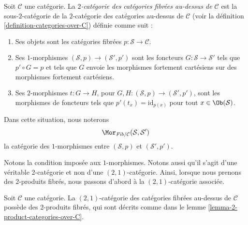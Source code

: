 \begin{definition}
\label{definition-fibred-categories-over-C}
Soit $\mathcal{C}$ une catégorie.
La {\it $2$-catégorie des catégories fibrées au-dessus de $\mathcal{C}$}
est la sous-$2$-catégorie de la $2$-catégorie des catégories
au-dessus de $\mathcal{C}$ (voir la
définition \ref{definition-categories-over-C}) définie comme suit :
\begin{enumerate}
\item Ses objets sont les catégories fibrées
$p : \mathcal{S} \to \mathcal{C}$.
\item Ses $1$-morphismes $(\mathcal{S}, p) \to (\mathcal{S}', p')$
sont les foncteurs $G : \mathcal{S} \to \mathcal{S}'$ tels que
$p' \circ G = p$ et tels que $G$ envoie les morphismes fortement cartésiens
sur des morphismes fortement cartésiens.
\item Ses $2$-morphismes $t : G \to H$, pour
$G, H : (\mathcal{S}, p) \to (\mathcal{S}', p')$, sont les morphismes de
foncteurs tels que $p'(t_x) = \text{id}_{p(x)}$
pour tout $x \in \Ob(\mathcal{S})$.
\end{enumerate}
Dans cette situation, nous noterons
$$
\Mor_{\textit{Fib}/\mathcal{C}}(\mathcal{S}, \mathcal{S}')
$$
la catégorie des $1$-morphismes entre
$(\mathcal{S}, p)$ et $(\mathcal{S}', p')$.
\end{definition}

\noindent
Notons la condition imposée aux $1$-morphismes.
Notons aussi qu'il s'agit d'une véritable $2$-catégorie et non d'une
$(2, 1)$-catégorie. Ainsi, lorsque nous prenons des $2$-produits fibrés,
nous passons d'abord à la $(2, 1)$-catégorie associée.

\begin{lemma}
\label{lemma-2-product-fibred-categories-over-C}
Soit $\mathcal{C}$ une catégorie.
La $(2, 1)$-catégorie des catégories fibrées au-dessus de $\mathcal{C}$
possède des 2-produits fibrés, qui sont décrits comme dans le
lemme \ref{lemma-2-product-categories-over-C}.
\end{lemma}

